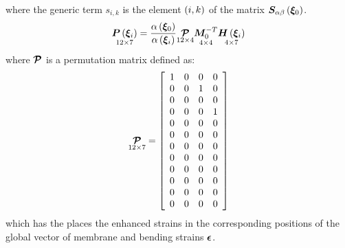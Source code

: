 where the generic term $s_{ i, k }$ is the element $\plbr{i,k}$ of the matrix $\TT{S}_{ \alpha \beta } \valxio$.\\
\begin{equation}
\underset{ 12 \times 7 }{ \TT{P} \valxii } =
\fracd{ \alpha \valxio }{ \alpha \valxii } \underset{ 12 \times 4  }{ \T{\mathcal{P}} } \underset{ 4 \times 4 }{ \TT{M}_{0}^{-T} } \underset{ 4 \times 7 }{ \TT{H} \valxii }
\end{equation}
where $\T{\mathcal{P}}$ is a permutation matrix defined as:
\begin{equation}
\underset{ 12 \times 7 }{ \T{\mathcal{P}} } =
\sqbr{ \matr{ c c c c  }{
1 & 0 & 0 & 0 \\
0 & 0 & 1 & 0 \\
0 & 0 & 0 & 0 \\
0 & 0 & 0 & 1 \\
0 & 0 & 0 & 0 \\
0 & 0 & 0 & 0 \\
0 & 0 & 0 & 0 \\
0 & 0 & 0 & 0 \\
0 & 0 & 0 & 0 \\
0 & 0 & 0 & 0 \\
0 & 0 & 0 & 0 \\
0 & 0 & 0 & 0
}}
\end{equation}
which has the places the enhanced strains in the corresponding positions of the global vector of membrane and bending strains $\T{\epsilon}$.
